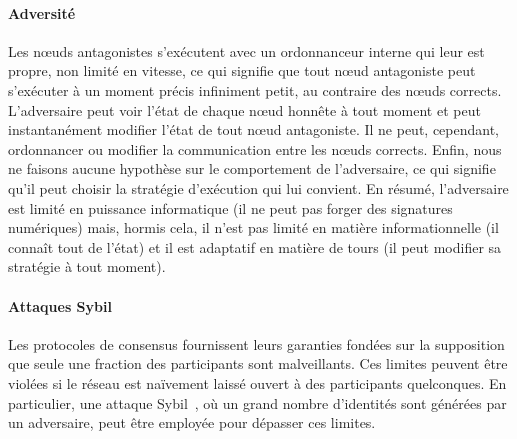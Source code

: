 \documentclass[letterpaper,twocolumn,10pt]{article}
\theoremstyle{definition}
\begin{document}
\paragraph{Adversité} %
Les nœuds antagonistes s'exécutent avec un ordonnanceur interne qui leur est propre, non limité en vitesse, ce qui signifie que tout nœud antagoniste peut s'exécuter à un moment précis infiniment petit, au contraire des nœuds corrects.
L'adversaire peut voir l'état de chaque nœud honnête à tout moment et peut instantanément modifier l'état de tout nœud antagoniste.
Il ne peut, cependant, ordonnancer ou modifier la communication entre les nœuds corrects.
Enfin, nous ne faisons aucune hypothèse sur le comportement de l'adversaire, ce qui signifie qu'il peut choisir la stratégie d'exécution qui lui convient.
En résumé, l'adversaire est limité en puissance informatique (il ne peut pas forger des signatures numériques) mais, hormis cela, il n'est pas limité en matière informationnelle (il connaît tout de l'état) et il est adaptatif en matière de tours (il peut modifier sa stratégie à tout moment).

\paragraph{Attaques Sybil}
Les protocoles de consensus fournissent leurs garanties fondées sur la supposition que seule une fraction des participants sont malveillants.
Ces limites peuvent être violées si le réseau est naïvement laissé ouvert à des participants quelconques.
En particulier, une attaque Sybil~\cite{douceur2002sybil}, où un grand nombre d'identités sont générées par un adversaire, peut être employée pour dépasser ces limites.
\end{document}
